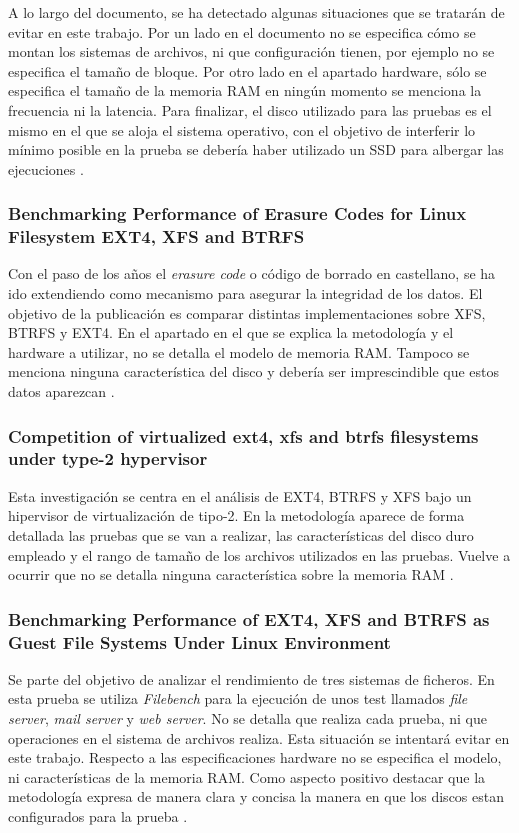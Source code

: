 A lo largo del documento, se ha detectado algunas situaciones que se tratarán de evitar en este trabajo. Por un lado en el documento no se especifica cómo se montan los sistemas de archivos, ni que configuración tienen, por ejemplo no se especifica el tamaño de bloque. Por otro lado en el apartado hardware, sólo se especifica el tamaño de la memoria RAM en ningún momento se menciona la frecuencia ni la latencia. Para finalizar, el disco utilizado para las pruebas es el mismo en el que se aloja el sistema operativo, con el objetivo de interferir lo mínimo posible en la prueba se debería haber utilizado un SSD para albergar las ejecuciones \cite{Kljaji2016PerformanceAO}.\\

\subsubsection{Benchmarking Performance of Erasure Codes for Linux Filesystem EXT4, XFS and BTRFS}
Con el paso de los años el \textit{erasure code} o código de borrado en castellano, se ha ido extendiendo como mecanismo para asegurar la integridad de los datos. El objetivo de la publicación es comparar distintas implementaciones sobre XFS, BTRFS y EXT4. En el apartado en el que se explica la metodología y el hardware a utilizar, no se detalla el modelo de memoria RAM. Tampoco se menciona ninguna característica del disco y debería ser imprescindible que estos datos aparezcan \cite{10.1007/978-981-15-6584-7_32}.


\subsubsection{Competition of virtualized ext4, xfs and btrfs filesystems under type-2 hypervisor}
Esta investigación se centra en el análisis de EXT4, BTRFS y XFS bajo un hipervisor de virtualización de tipo-2. En la metodología aparece de forma detallada las pruebas que se van a realizar, las características del disco duro empleado y el rango de tamaño de los archivos utilizados en las pruebas. Vuelve a ocurrir que no se detalla ninguna característica sobre la memoria RAM \cite{competitionvirtualized}.

\subsubsection{Benchmarking Performance of EXT4, XFS and BTRFS as Guest File Systems Under Linux Environment}
Se parte del objetivo de analizar el rendimiento de tres sistemas de ficheros. En esta prueba se utiliza  \textit{Filebench} para la ejecución de unos test llamados \textit{file server}, \textit{mail server} y \textit{web server}. No se detalla que realiza cada prueba, ni que operaciones en el sistema de archivos realiza. Esta situación se intentará evitar en este trabajo. Respecto a las especificaciones hardware no se especifica el modelo, ni características de la memoria RAM. Como aspecto positivo destacar que la metodología expresa de manera clara y concisa la manera en que los discos estan configurados para la prueba \cite{serbios}.


